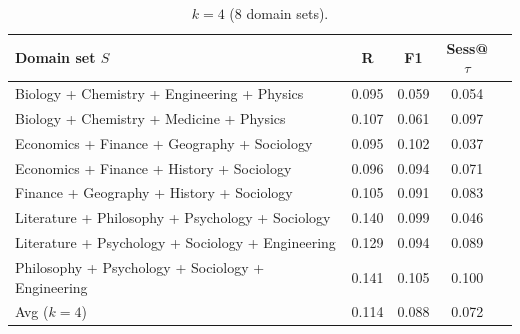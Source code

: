 \begin{table}[!ht]
\begin{subtable}[t]{\textwidth}
\caption{$k{=}4$ (8 domain sets).}
\centering
\begin{tabular}{lcccc}
\toprule
Domain set $S$ &
R &
F1 &
Sess@$\tau$ \\
\midrule
Biology + Chemistry + Engineering + Physics            & 0.095 & 0.059 & 0.054 \\
Biology + Chemistry + Medicine + Physics               & 0.107 & 0.061 & 0.097 \\
Economics + Finance + Geography + Sociology            & 0.095 & 0.102 & 0.037 \\
Economics + Finance + History + Sociology              & 0.096 & 0.094 & 0.071 \\
Finance + Geography + History + Sociology             & 0.105 & 0.091 & 0.083 \\
Literature + Philosophy + Psychology + Sociology       & 0.140 & 0.099 & 0.046 \\
Literature + Psychology + Sociology + Engineering      & 0.129 & 0.094 & 0.089 \\
Philosophy + Psychology + Sociology + Engineering      & 0.141 & 0.105 & 0.100 \\
\midrule
Avg ($k{=}4$)                                          & 0.114 & 0.088 & 0.072 \\
\bottomrule
\end{tabular}
\end{subtable}
\end{table}


